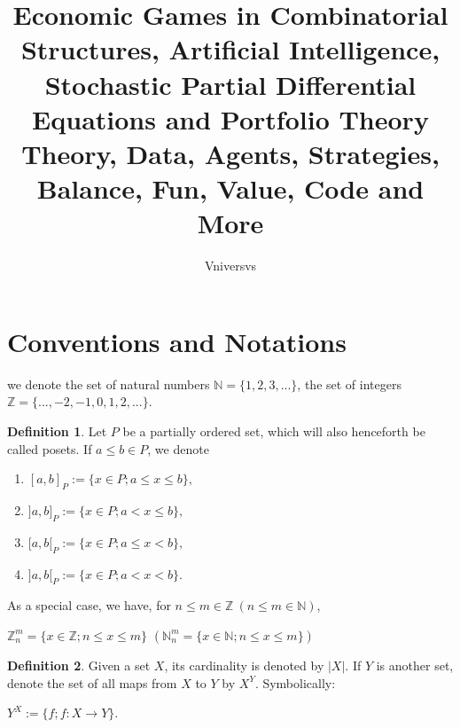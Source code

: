 \documentclass[]{article}
\title{%
	Economic Games in Combinatorial Structures, Artificial Intelligence, Stochastic Partial Differential Equations and Portfolio Theory \\
	\large Theory, Data, Agents, Strategies, Balance, Fun, Value, Code and More\\}
\author{Vniversvs}
\theoremstyle{definition}
\newtheorem{definition}{Definition}[section]
\theoremstyle{definition}
\newcommand{\raw}{\rightarrow}
\newcommand{\bb}{\mathbb}
\begin{document}
	
	\maketitle
	
	\begin{abstract}
		
	\end{abstract}
	
	\tableofcontents
	
	\section{Conventions and Notations}
	
	we denote the set of natural numbers $\bb{N} = \{1, 2, 3, ... \}$, the set of integers $\bb{Z} = \{..., -2,-1,0,1,2,... \}$. 
	
	\begin{definition}
		Let $P$ be a partially ordered set, which will also henceforth be called posets.	If $a \leq b \in P$, we denote 
		
		\begin{center}
			\begin{enumerate}
				\item 	$[a,b]_P :=\{x \in P; a\leq x\leq b\},$
				\item 	$]a,b]_P :=\{x \in P; a < x\leq b\},$
				\item 	$[a,b[_P :=\{x \in P; a\leq x < b\},$		
				\item 	$]a,b[_P :=\{x \in P; a < x < b\}.$
			\end{enumerate}
			
		\end{center}
		
	\end{definition}
	
	As a special case, we have, for $n \leq m \in \bb{Z}\  (n \leq m \in \bb{N})$, 
	
	\begin{center}
		$\bb{Z}_n^m=\{x\in\bb{Z}; n\leq x \leq m\}$ $(\bb{N}_n^m=\{x\in\bb{N}; n\leq x \leq m\})$
	\end{center}
	
	\begin{definition}
		Given a set $X$, its cardinality is denoted by $|X|$. If $Y$ is another set, denote the set of all maps from $X$ to $Y$ by $X^Y$. Symbolically:
		
		\begin{center}
			$Y^X := \{f; f:X \raw Y\} $.
		\end{center}
		
	\end{definition}
	
\end{document}
